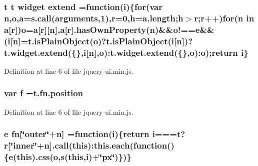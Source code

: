 {{\subsubsection[{\texorpdfstring{extend}{extend}}]{ {\bf t} {\bf t} {\bf widget} extend =function({\bf i})\{{\bf for}(var {\bf n},{\bf o},{\bf a}={\bf s.\+call}(arguments,1),{\bf r}=0,{\bf h}=a.\+length;{\bf h}$>${\bf r};{\bf r}++){\bf for}({\bf n} in {\bf a}\mbox{[}{\bf r}\mbox{]}){\bf o}={\bf a}\mbox{[}{\bf r}\mbox{]}\mbox{[}{\bf n}\mbox{]},{\bf a}\mbox{[}{\bf r}\mbox{]}.has\+Own\+Property({\bf n})\&\&o!=={\bf e}\&\&({\bf i}\mbox{[}{\bf n}\mbox{]}=t.\+is\+Plain\+Object({\bf o})?t.\+is\+Plain\+Object({\bf i}\mbox{[}{\bf n}\mbox{]})?t.\+widget.\+extend(\{\},{\bf i}\mbox{[}{\bf n}\mbox{]},{\bf o})\+:t.\+widget.\+extend(\{\},{\bf o})\+:{\bf o});return {\bf i}\}}\hypertarget{jquery-ui_8min_8js_ad56bf8fee2d8093072983fa0dad19143}{}\label{jquery-ui_8min_8js_ad56bf8fee2d8093072983fa0dad19143}


Definition at line 6 of file jquery-\/ui.\+min.\+js.

\subsubsection[{\texorpdfstring{f}{f}}]{\setlength{\rightskip}{0pt plus 5cm}var f ={\bf t.\+fn.\+position}}\hypertarget{jquery-ui_8min_8js_a9cf09a2972472098a4c689fd988f4dfc}{}\label{jquery-ui_8min_8js_a9cf09a2972472098a4c689fd988f4dfc}


Definition at line 6 of file jquery-\/ui.\+min.\+js.

\subsubsection[{\texorpdfstring{fn}{fn}}]{ {\bf e} fn\mbox{[}\char`\"{}outer\char`\"{}+n\mbox{]} =function({\bf i})\{return {\bf i}==={\bf t}?{\bf r}\mbox{[}\char`\"{}inner\char`\"{}+n\mbox{]}.{\bf call}({\bf this})\+:{\bf this.\+each}(function()\{{\bf e}({\bf this}).css({\bf o},{\bf s}({\bf this},{\bf i})+\char`\"{}px\char`\"{})\})\}}\hypertarget{jquery-ui_8min_8js_aabc758060cfaa8c40e1b069c426b2fb9}{}\label{jquery-ui_8min_8js_aabc758060cfaa8c40e1b069c426b2fb9}


}}
